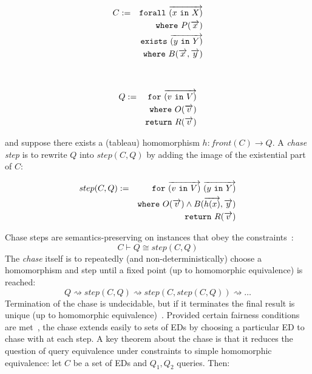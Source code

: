 \documentclass[preprint]{sigplanconf}
\newcommand{\FOR}{{\tt for} \ }
\newcommand{\FORALL}{{\tt forall} \ }
\newcommand{\EXISTS}{{\tt exists} \ }
\newcommand{\WHERE}{{\tt where} \ }
\newcommand{\IN}{ \ {\tt in} \ }
\newcommand{\RETURN}{{\tt return} \ }
\begin{document}
\parbox{1.5in}{
\begin{eqnarray*}
 C & := & \FORALL \overrightarrow{(x \IN X)} \\
 & & \WHERE P(\overrightarrow{x}) \\
 & & \EXISTS \overrightarrow{(y \IN Y)} \\
 & & \WHERE B(\overrightarrow{x}, \overrightarrow{y})
\end{eqnarray*}
} \ \ \ \ \ \parbox{1.5in}{
\begin{eqnarray*}
Q & := & \FOR \overrightarrow{(v \IN V)} \\
 & & \WHERE  O(\overrightarrow{v}) \\ 
 & & \RETURN R(\overrightarrow{v})
\end{eqnarray*}
}
and suppose there exists a (tableau) homomorphism $h : front(C) \to Q$.  A {\it chase step} is to rewrite $Q$ into $step(C,Q)$ by adding the image of the existential part of $C$:
\begin{normalsize}
\begin{eqnarray*}
step(C,Q) & := & \FOR \overrightarrow{(v \IN V)} \ \overrightarrow{(y \IN Y)} \\
 & & \WHERE  O(\overrightarrow{v}) \wedge B(\overrightarrow{h(x)}, \overrightarrow{y}) 
\\ 
 & & \RETURN R(\overrightarrow{v})
\end{eqnarray*}
\end{normalsize}
Chase steps are semantics-preserving on instances that obey the constraints~\cite{Popa99anequational}:
$$C \vdash Q \cong step(C,Q)$$
The {\it chase} itself is to repeatedly (and non-deterministically) choose a homomorphism and step until a fixed point (up to homomorphic equivalence) is reached:
$$
Q \rightsquigarrow step(C, Q) \rightsquigarrow step(C, step(C, Q)) \rightsquigarrow \ldots 
$$
Termination of the chase is undecidable, but if it terminates the final result is unique (up to homomorphic equivalence)~\cite{Deutsch:2006:QRC:1121995.1122010}.  Provided certain fairness conditions are met~\cite{Deutsch:2006:QRC:1121995.1122010}, the chase extends easily to sets of EDs by choosing a particular ED to chase with at each step.  A key theorem about the chase is that it reduces the question of query equivalence under constraints to simple homomorphic equivalence: let $C$ be a set of EDs and $Q_1, Q_2$ queries.  Then:
\end{document}
